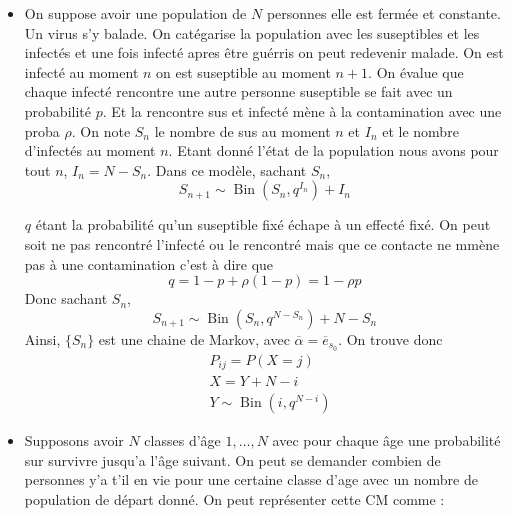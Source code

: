 \begin{exemple}
\begin{itemize}
\item[Epidémies SIS :]
On suppose avoir une population de $N$ personnes elle est fermée et constante. Un virus s'y balade. On catégarise la population avec les suseptibles et les infectés et une fois infecté apres être guérris on peut redevenir malade. On est infecté au moment $n$ on est suseptible au moment $n+1$. On évalue que chaque infecté rencontre une autre personne suseptible se fait avec un probabilité $p$. Et la rencontre sus et infecté mène à la contamination avec une proba $\rho$. On note $S_n$ le nombre de sus au moment $n$ et $I_n$ et le nombre d'infectés au moment $n$. Etant donné l'état de la population nous avons pour tout $n$, $I_n= N-S_n$. Dans ce modèle, sachant $S_n$,
$$S_{n+1} \sim \operatorname{Bin}(S_n, q^{I_n})+ I_n$$

$q$ étant la probabilité qu'un suseptible fixé échape à un effecté fixé. On peut soit ne pas rencontré l'infecté ou le rencontré mais que ce contacte ne mmène pas à une contamination  c'est à dire que $$q = 1-p +\rho(1-p)= 1-\rho p$$ Donc sachant $S_n$,
$$S_{n+1} \sim \operatorname{Bin}(S_n, q^{N-S_n})+ N-S_n$$
Ainsi, $\{S_n\}$ est une chaine de Markov, avec $\overline{\alpha}= \overline{e}_{s_0}$. On trouve donc \begin{align*}
    &P_{ij}= P(X= j)\\
     &X= Y+ N - i\\
     &Y \sim \operatorname{Bin}(i, q^{N-i})
\end{align*}
\item[Durées de vie :]
Supposons avoir $N$ classes d'âge $1,\dots, N$ avec pour chaque âge une probabilité sur survivre jusqu'a l'âge suivant. On peut se demander combien de personnes y'a t'il en vie pour une certaine classe d'age avec un nombre de population de départ donné.
On peut représenter cette CM comme :


\begin{center}

\begin{tikzpicture}[x=0.75pt,y=0.75pt,yscale=-1,xscale=1]


\end{tikzpicture}
\end{center}
\end{itemize}
\end{exemple}
